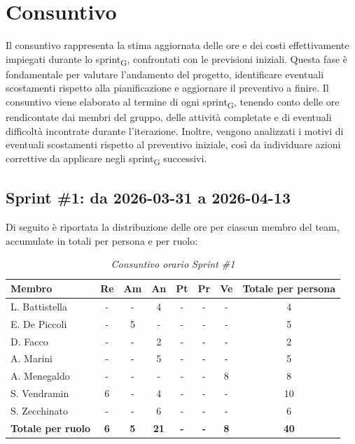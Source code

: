 \documentclass[a4paper, 10pt, colorlinks=true, linkcolor=black, urlcolor=blue, citecolor=blue, hidelinks]{article}
\renewcommand{\arraystretch}{1.2}
\begin{document}
\section{Consuntivo}
Il consuntivo rappresenta la stima aggiornata delle ore e dei costi effettivamente impiegati durante lo sprint\textsubscript{G}, confrontati con le previsioni iniziali. Questa fase è fondamentale per valutare l'andamento del progetto, identificare eventuali scostamenti rispetto alla pianificazione e aggiornare il preventivo a finire.
Il consuntivo viene elaborato al termine di ogni sprint\textsubscript{G}, tenendo conto delle ore rendicontate dai membri del gruppo, delle attività completate e di eventuali difficoltà incontrate durante l'iterazione. Inoltre, vengono analizzati i motivi di eventuali scostamenti rispetto al preventivo iniziale, così da individuare azioni correttive da applicare negli sprint\textsubscript{G} successivi.

\subsection{Sprint \#1: da 2026-03-31 a 2026-04-13}

Di seguito è riportata la distribuzione delle ore per ciascun membro del team,
accumulate in totali per persona e per ruolo:
\begin{table}[H]
    \centering
    \renewcommand{\arraystretch}{1.4}
    \begin{tabular}{|l|c|c|c|c|c|c|c|}
        \hline
        \rowcolor{bluBitless!15}
        \textbf{Membro} & \textbf{Re} & \textbf{Am} & \textbf{An} & \textbf{Pt} & \textbf{Pr} & \textbf{Ve} & \textbf{Totale per persona} \\
        \hline
        L. Battistella & - & - & 4 & - & - & - & 4 \\ \hline
        E. De Piccoli & - & 5 & - & - & - & - & 5 \\ \hline
        D. Facco & - & - & 2 & - & - & - & 2 \\ \hline
        A. Marini & - & - & 5 & - & - & - & 5 \\ \hline
        A. Menegaldo & - & - & - & - & - & 8 & 8 \\ \hline
        S. Vendramin & 6 & - & 4 & - & - & - & 10 \\ \hline
        S. Zecchinato & - & - & 6 & - & - & - & 6 \\ \hline
        \rowcolor{bluBitless!8}
        \textbf{Totale per ruolo} & \textbf{6} & \textbf{5} & \textbf{21} & \textbf{-} & \textbf{-} & \textbf{8} & \textbf{40} \\
        \hline
    \end{tabular}
    \caption{\textit{Consuntivo orario Sprint \#1}}
\end{table}
\end{document}
